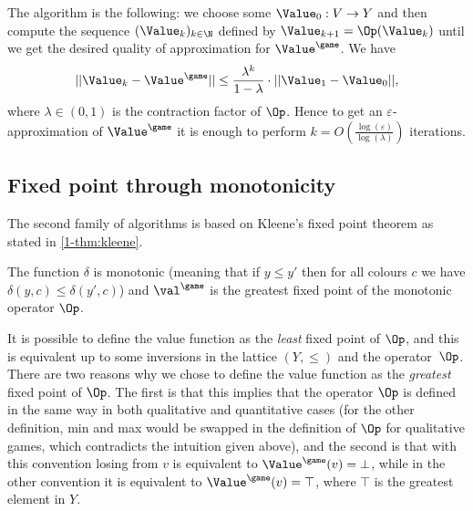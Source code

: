 The algorithm is the following:
we choose some $\Value_0 : V \to Y$ and then compute the sequence $(\Value_k)_{k \in \N}$ defined by $\Value_{k+1} = \Op(\Value_k)$
until we get the desired quality of approximation for $\Value^{\game}$.
We have
\[
||\Value_k - \Value^{\game}|| \le \frac{\lambda^k}{1 - \lambda} \cdot ||\Value_1 - \Value_0||,
\]
where $\lambda \in (0,1)$ is the contraction factor of $\Op$.
Hence to get an $\varepsilon$-approximation of $\Value^{\game}$ it is enough to perform 
$k = O \left( \frac{\log(\varepsilon)}{\log(\lambda)} \right)$ iterations.

\subsection*{Fixed point through monotonicity}
The second family of algorithms is based on Kleene's fixed point theorem as stated in \cref{1-thm:kleene}.

\begin{principle}
The function $\delta$ is monotonic (meaning that if $y \le y'$ then for all colours $c$ we have $\delta(y,c) \le \delta(y',c)$)
and $\val^{\game}$ is the greatest fixed point of the monotonic operator $\Op$.
\end{principle}

\begin{remark}
It is possible to define the value function as the \textit{least} fixed point of $\Op$, 
and this is equivalent up to some inversions in the lattice $(Y,\le)$ and the operator~$\Op$.
There are two reasons why we chose to define the value function as the \textit{greatest} fixed point of $\Op$.
The first is that this implies that the operator $\Op$ is defined in the same way in both qualitative and quantitative cases (for the other definition, min and max would be swapped in the definition of $\Op$ for qualitative games, which contradicts the intuition given above),
and the second is that with this convention losing from $v$ is equivalent to $\Value^{\game}(v) = \bot$,
while in the other convention it is equivalent to $\Value^{\game}(v) = \top$, where $\top$ is the greatest element in $Y$.
\end{remark}

